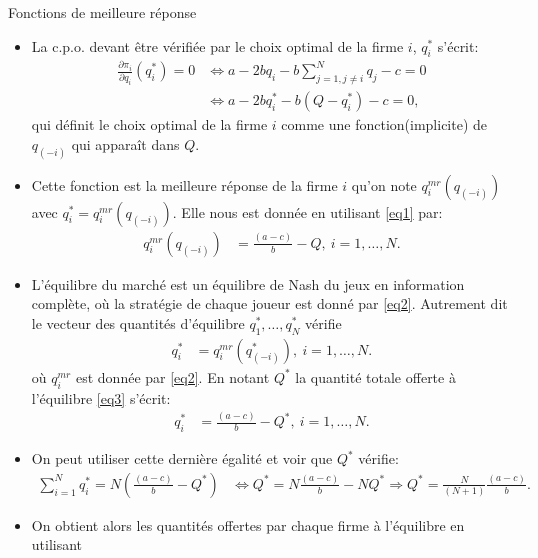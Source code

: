 \begin{frame}[allowframebreaks]{Fonctions de meilleure réponse}
    \begin{itemize}
        \item La c.p.o. devant être vérifiée par le choix optimal de la firme $i$, $q_i^*$ s'écrit: 
        \begin{align}
            \frac{\partial \pi_i}{\partial q_i}(q_i^*) =0 &\Leftrightarrow a-2bq_i -b\sum_{j=1, j\neq i }^N q_j - c = 0\\
            &\Leftrightarrow  a-2bq_i^* -b\left(Q - q_i^*\right) - c= 0,
            \label{eq1}
        \end{align}
         qui définit le choix optimal de la firme $i$ comme une fonction(implicite) de $q_{(-i)}$ qui apparaît 
         dans $Q$. 
         \item Cette fonction est la meilleure réponse de la firme $i$ qu'on note $q^{mr}_i(q_{(-i)})$ avec 
         $q_i^* = q^{mr}_i(q_{(-i)})$. Elle nous est donnée en utilisant \eqref{eq1} par: 
        \begin{align} 
            q_i^{mr}(q_{(-i)}) &= \frac{(a-c)}{b} - Q, \ i=1, \ldots, N.
            \label{eq2}
        \end{align}
           \item L'équilibre du marché est un équilibre de Nash du jeux en information complète, où
           la stratégie de chaque joueur est donné par \eqref{eq2}. 
           Autrement dit le vecteur des quantités d'équilibre $q_1^*, \ldots, q_N^*$ vérifie 
           \begin{align}
               q_i^*&= q_i^{mr}(q_{(-i)}^*), \ i=1, \ldots, N.
               \label{eq3}
           \end{align}
           où $q_i^{mr}$ est donnée par \eqref{eq2}. En notant $Q^*$ la quantité totale offerte 
           à l'équilibre \eqref{eq3} s'écrit:
           \begin{align*}
            q_i^*&=\frac{(a-c)}{b} - Q^*, \ i=1, \ldots, N.
           \end{align*}
           \item On peut utiliser cette dernière égalité et voir que $Q^*$ vérifie:
           \begin{align*}
            \sum_{i=1}^N  q_i^* = N\left(\frac{(a-c)}{b} - Q^*\right)
            &\Leftrightarrow Q^* = N\frac{(a-c)}{b} - NQ^*
            \Rightarrow  Q^* = \frac{N}{(N+1)}\frac{(a-c)}{b}.
           \end{align*}
           \item On obtient alors les quantités offertes par chaque firme à l'équilibre en utilisant

\end{itemize}
\end{frame}
